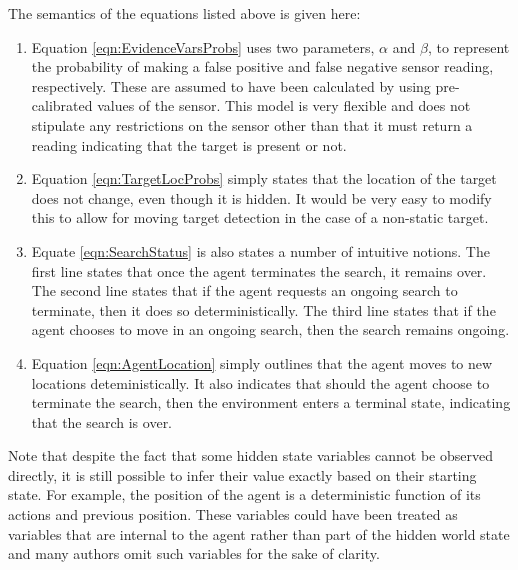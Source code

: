 \normalsize
The semantics of the equations listed above is given here: 
\begin{enumerate}
    \item Equation \ref{eqn:EvidenceVarsProbs} uses two parameters, $\alpha$ and $\beta$, to represent the probability of making a false positive and false negative sensor reading, respectively. These are assumed to have been calculated by using pre-calibrated values of the sensor. This model is very flexible and does not stipulate any restrictions on the sensor other than that it must return a reading indicating that the target is present or not.
    \item  Equation \ref{eqn:TargetLocProbs} simply states that the location of the target does not change, even though it is hidden. It would be very easy to modify this to allow for moving target detection in the case of a non-static target.
    \item Equate \ref{eqn:SearchStatus} is also states a number of intuitive notions. The first line states that once the agent terminates the search, it remains over. The second line states that if the agent requests an ongoing search to terminate, then it does so deterministically. The third line states that if the agent chooses to move in an ongoing search, then the search remains ongoing.
    \item Equation \ref{eqn:AgentLocation} simply outlines that the agent moves to new locations deteministically. It also indicates that should the agent choose to terminate the search, then the environment enters a terminal state, indicating that the search is over.
\end{enumerate}


Note that despite the fact that some hidden state variables cannot be observed directly, it is still possible to infer their value exactly based on their starting state. For example, the position of the agent is a deterministic function of its actions and previous position. These variables could have been treated as variables that are internal to the agent rather than part of the hidden world state and many authors omit such variables for the sake of clarity.


